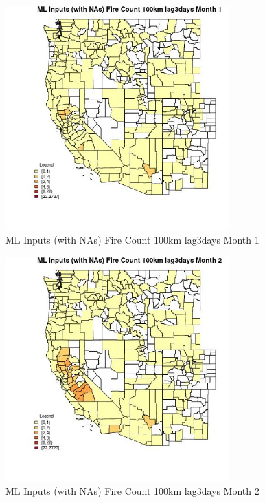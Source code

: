 \begin{figure} 
\centering  
\includegraphics[width=0.77\textwidth]{Code_Outputs/Report_ML_input_PM25_Step4_part_f_de_duplicated_aves_prioritize_24hr_obswNAs_CountyFire_Count_100km_lag3daysmedianMonth1.jpg} 
\caption{\label{fig:Report_ML_input_PM25_Step4_part_f_de_duplicated_aves_prioritize_24hr_obswNAsCountyFire_Count_100km_lag3daysmedianMonth1}ML Inputs (with NAs) Fire Count 100km lag3days Month 1} 
\end{figure} 
 

\begin{figure} 
\centering  
\includegraphics[width=0.77\textwidth]{Code_Outputs/Report_ML_input_PM25_Step4_part_f_de_duplicated_aves_prioritize_24hr_obswNAs_CountyFire_Count_100km_lag3daysmedianMonth2.jpg} 
\caption{\label{fig:Report_ML_input_PM25_Step4_part_f_de_duplicated_aves_prioritize_24hr_obswNAsCountyFire_Count_100km_lag3daysmedianMonth2}ML Inputs (with NAs) Fire Count 100km lag3days Month 2} 
\end{figure} 
 

